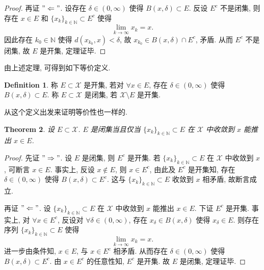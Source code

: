 \documentclass[a4paper,11pt]{article}
\newtheorem{theorem}{Theorem}[section]
\theoremstyle{definition}
\newtheorem{definition}[theorem]{Definition}
\begin{document}
\begin{CJK*}{UTF8}{gbsn}
\begin{proof}
    再证 $ "\Leftarrow" $. 设存在 $ \delta \in (0, \infty) $ 使得 $ B(x, \delta) \subset E $.
    反设 $ E^c $ 不是闭集, 则存在 $ x \in E $ 和 $ \{x_k\}_{k \in \mathbb{N}} \subset E^c $ 使得 
    $$
        \lim_{k \to \infty} x_k = x.
    $$
    因此存在 $ k_0 \in \mathbb{N} $ 使得 $ d(x_{k_0}, x) < \delta $, 故 $ x_{k_0} \in B(x, \delta) \cap E^c $, 矛盾.
    从而 $ E^c $ 不是闭集, 故 $ E $ 是开集, 定理证毕.
\end{proof}

由上述定理, 可得到如下等价定义.

\begin{definition} \label{def2}
    称 $ E \subset \mathcal{X} $ 是开集, 若对 $ \forall x \in E $, 
    存在 $ \delta \in (0, \infty) $ 使得 $ B(x, \delta) \subset E $.
    称 $ E \subset \mathcal{X} $ 是闭集, 若 $ \mathcal{X} \setminus E $ 是开集.
\end{definition}

从这个定义出发来证明等价性也一样的.

\begin{theorem}
    设 $ E \subset \mathcal{X} $. $ E $ 是闭集当且仅当 
    $ \{x_k\}_{k \in \mathbb{N}} \subset E $ 在 $ \mathcal{X} $ 中收敛到 $ x $ 能推出 $ x \in E $.
\end{theorem}

\begin{proof}
    先证 $ "\Rightarrow" $. 设 $ E $ 是闭集, 则 $ E^c $ 是开集.
    若 $ \{x_k\}_{k \in \mathbb{N}} \subset E $ 在 $ \mathcal{X} $ 中收敛到 $ x $, 可断言 $ x \in E $.
    事实上, 反设 $ x \notin E $, 则 $ x \in E^c $, 由此及 $ E^c $ 是开集知,
    存在 $ \delta \in (0, \infty) $ 使得 $ B(x, \delta) \subset E^c $.
    这与 $ \{x_k\}_{k \in \mathbb{N}} \subset E $ 收敛到 $ x $ 相矛盾, 故断言成立.
    
    再证 $ "\Leftarrow" $. 
    设 $ \{x_k\}_{k \in \mathbb{N}} \subset E $ 在 $ \mathcal{X} $ 中收敛到 $ x $ 能推出 $ x \in E $.
    下证 $ E^c $ 是开集. 事实上, 对 $ \forall x \in E^c $, 
    反设对 $ \forall \delta \in (0, \infty) $, 存在 $ x_\delta \in B(x, \delta) $ 使得 $ x_\delta \in E $. 
    则存在序列 $ \{x_k\}_{k \in \mathbb{N}} \subset E $ 使得
    $$
        \lim_{k \to \infty} x_k = x.
    $$
    进一步由条件知, $ x \in E $, 与 $ x \in E^c $ 相矛盾. 
    从而存在 $ \delta \in (0, \infty) $ 使得 $ B(x, \delta) \subset E^c $.
    由 $ x \in E^c $ 的任意性知, $ E^c $ 是开集. 故 $ E $ 是闭集, 定理证毕.
\end{proof}


\end{CJK*}
\end{document}
